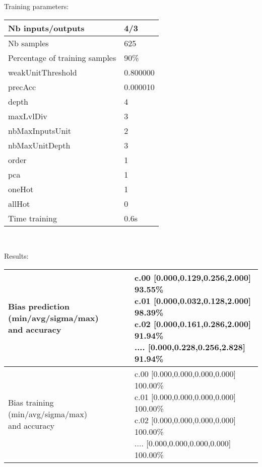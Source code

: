 Training parameters:\\
\begin{center}
\begin{tabular}{|l|l|}
\hline
Nb inputs/outputs&4/3\\
\hline
Nb samples&625\\
\hline
Percentage of training samples&90\%\\
\hline
weakUnitThreshold&0.800000\\
\hline
precAcc&0.000010\\
\hline
depth&4\\
\hline
maxLvlDiv&3\\
\hline
nbMaxInputsUnit&2\\
\hline
nbMaxUnitDepth&3\\
\hline
order&1\\
\hline
pca&1\\
\hline
oneHot&1\\
\hline
allHot&0\\
\hline
Time training&0.6s\\
\hline
\end{tabular}\\
\end{center}\newline
Results:
\begin{center}
\begin{tabular}{|l|l|}
\hline
\makecell{Bias prediction (min/avg/sigma/max)\\and accuracy}&\makecell{c.00 [0.000,0.129,0.256,2.000] 93.55\%\\
c.01 [0.000,0.032,0.128,2.000] 98.39\%\\
c.02 [0.000,0.161,0.286,2.000] 91.94\%\\
.... [0.000,0.228,0.256,2.828] 91.94\%\\
}\\

\hline
\makecell{Bias training (min/avg/sigma/max)\\and accuracy}&\makecell{c.00 [0.000,0.000,0.000,0.000] 100.00\%\\
c.01 [0.000,0.000,0.000,0.000] 100.00\%\\
c.02 [0.000,0.000,0.000,0.000] 100.00\%\\
.... [0.000,0.000,0.000,0.000] 100.00\%\\
}\\
\hline
\end{tabular}\
\end{center}

